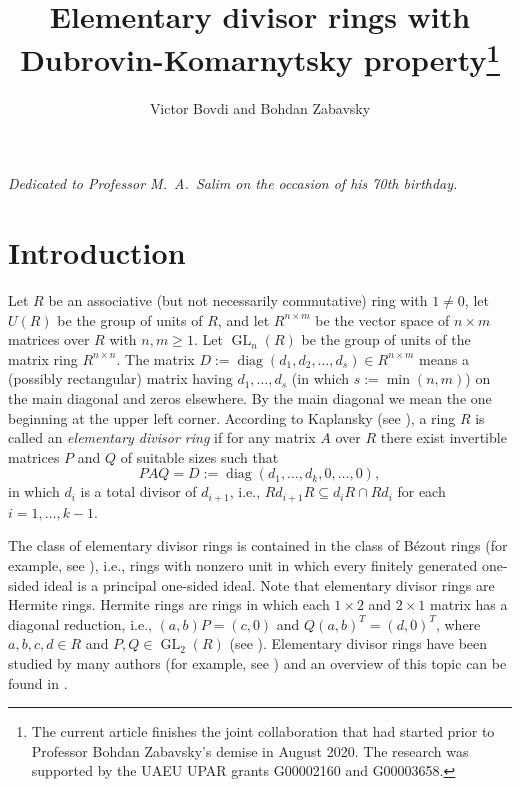 \documentclass{cimart}
\title[Elementary divisor rings with Dubrovin-Komarnytsky property]{Elementary divisor rings with \\ Dubrovin-Komarnytsky property\footnote{The current  article finishes the joint collaboration that had started prior to Professor Bohdan  Zabavsky's demise in August 2020.  
The research  was supported by the UAEU  UPAR  grants  G00002160 and G00003658.}}
\author{Victor Bovdi and Bohdan Zabavsky}
\DeclareMathOperator\GL{GL}
\DeclareMathOperator\diag{diag}
\begin{document}
\vspace*{-1ex}
\begin{flushright}
    \textit{Dedicated to Professor M.~A.~Salim on the occasion of his 70th birthday.}
\end{flushright}

\tableofcontents



\section{Introduction}
Let $R$ be an associative (but not necessarily commutative) ring with $1\not=0$, let $U(R)$ be the group of units of $R$, and let $R^{n\times m}$ be the vector space  of ${n\times m}$ matrices over $R$ with $n,m\geq 1$. Let $\GL_n(R)$ be the group of units of the matrix ring $R^{n\times n}$.
The matrix $D:=\diag(d_{1},d_{2},\ldots,d_{s})\in R^{n\times m}$ means a (possibly rectangular) matrix  having $d_{1},\ldots, d_{s}$ (in which $s:=\min(n,m)$) on the main diagonal and zeros elsewhere.  By the main diagonal we mean the one beginning at the upper left corner. According to Kaplansky (see \cite[p.\,465]{7-kaplansky}),    a ring $R$ is called an {\it elementary divisor ring} if for any matrix $A$ over $R$ there exist invertible matrices $P$ and $Q$  of suitable sizes such that
\begin{equation}\label{FFF}
PAQ=D:=\diag(d_1,\ldots,d_k,0,\ldots,0),
\end{equation}
in which  $d_{i}$ is a total divisor of $d_{i+1}$, i.e., $Rd_{i+1}R\subseteq d_iR\cap Rd_i$ for each $i=1,\ldots, k-1$.

The class of elementary divisor rings is contained in the class of B\'ezout rings (for example, see \cite{7-kaplansky, Mon_Shchedryk, 1-zabavsky}), i.e.,  rings with nonzero unit in which every finitely generated one-sided ideal is a principal one-sided ideal. Note that  elementary divisor rings are Hermite rings. Hermite rings are    rings in which each  $1\times 2$ and $2\times 1$ matrix   has a  diagonal reduction, i.e., $(a,b)P=(c,0)$ and $Q(a, b)^T=(d,0)^T$, where    $a, b, c, d\in R$ and   $P, Q\in \GL_2(R)$  (see \cite{7-kaplansky, 1-zabavsky}). Elementary divisor rings have been studied by many authors (for example, see \cite{Ara_Goodearl_OMeara_Pardo, Bovdi_Zabavsky, Bovdi_Zabavsky_2, Bovdi_Shchedryk_2, Bovdi_Shchedryk, Chen_Abdolyousefi, Dopico_Noferini_Zaballa,  Dubrovin_82, 3-dubrovin, Gatalevich, Calugareanu_Pop_Vasiu, Menal_Moncasi, 2-zabkom}) and an overview of this topic  can be found in \cite{9-cohn, 7-kaplansky, Mon_Shchedryk, Shchedryk_2012, 1-zabavsky}.
\end{document}
